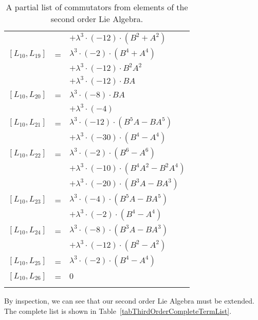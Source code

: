 \documentclass{article}
\begin{document}
\begin{center}
\begin{longtable}{lll}
 & & $ + {\lambda}^3{\cdot}(-12){\cdot}(B^{2}+A^{2})$ \\
$[L_{10},L_{19}]$ & = & ${\lambda}^3{\cdot}(-2){\cdot}(B^{4}+A^{4})$ \\*
 & & $ + {\lambda}^3{\cdot}(-12){\cdot}B^{2}A^{2}$ \\*
 & & $ + {\lambda}^3{\cdot}(-12){\cdot}BA$ \\
$[L_{10},L_{20}]$ & = & ${\lambda}^3{\cdot}(-8){\cdot}BA$ \\*
 & & $ + {\lambda}^3{\cdot}(-4)$ \\
$[L_{10},L_{21}]$ & = & ${\lambda}^3{\cdot}(-12){\cdot}(B^{5}A-BA^{5})$ \\*
 & & $ + {\lambda}^3{\cdot}(-30){\cdot}(B^{4}-A^{4})$ \\
$[L_{10},L_{22}]$ & = & ${\lambda}^3{\cdot}(-2){\cdot}(B^{6}-A^{6})$ \\*
 & & $ + {\lambda}^3{\cdot}(-10){\cdot}(B^{4}A^{2}-B^{2}A^{4})$ \\*
 & & $ + {\lambda}^3{\cdot}(-20){\cdot}(B^{3}A-BA^{3})$ \\
$[L_{10},L_{23}]$ & = & ${\lambda}^3{\cdot}(-4){\cdot}(B^{5}A-BA^{5})$ \\*
 & & $ + {\lambda}^3{\cdot}(-2){\cdot}(B^{4}-A^{4})$ \\
$[L_{10},L_{24}]$ & = & ${\lambda}^3{\cdot}(-8){\cdot}(B^{3}A-BA^{3})$ \\*
 & & $ + {\lambda}^3{\cdot}(-12){\cdot}(B^{2}-A^{2})$ \\
$[L_{10},L_{25}]$ & = & ${\lambda}^3{\cdot}(-2){\cdot}(B^{4}-A^{4})$ \\
$[L_{10},L_{26}]$ & = & $ 0 $ \\
\caption{A partial list of commutators from elements of the second order Lie Algebra. \label{tabThirdOrderCommutators}}
\end{longtable}
\end{center}

\clearpage
\newpage

By inspection, we can see that our second order Lie Algebra must be extended.  The complete list is shown in Table~\ref{tabThirdOrderCompleteTermList}.
\end{document}
